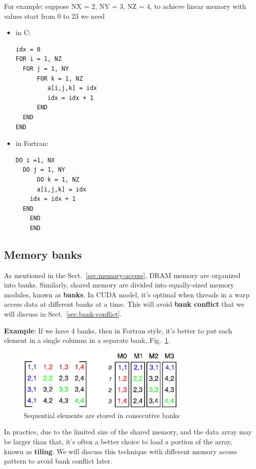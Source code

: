 For example: suppose NX = 2, NY = 3, NZ = 4, to achieve linear memory
with values start from 0 to 23 we need
\begin{multicols}{2}
  \begin{itemize}
  \item in C:
\begin{verbatim}
idx = 0
FOR i = 1, NZ
  FOR j = 1, NY
      FOR k = 1, NZ
         a[i,j,k] = idx
         idx = idx + 1
      END
  END
END
\end{verbatim}
    \columnbreak
  \item in Fortran:
\begin{verbatim}
DO i =1, NX
  DO j = 1, NY
      DO k = 1, NZ
      a[i,j,k] = idx
    idx = idx + 1
  END
    END
    END
\end{verbatim}
  \end{itemize}  
\end{multicols}

\subsection{Memory banks}
\label{sec:memory-banks}

As mentioned in the Sect.~\ref{sec:memory-access}, DRAM memory are
organized into banks. Similarly, shared memory are divided into
equally-sized memory modules, known as {\bf banks}. In CUDA model,
it's optimal when threads in a warp access data at different banks at
a time. This will avoid {\bf bank conflict} that we will discuss in
Sect.~\ref{sec:bank-conflict}.

{\bf Example}: If we have 4 banks, then in Fortran style, it's better
to put each element in a single columns in a separate bank,
Fig.~\ref{fig:bank_sample}. 

\begin{figure}[hbt]
  \centerline{\includegraphics[height=3cm,
    angle=0]{./images/banks_sample.eps}}
  \caption{Sequential elements are stored in consecutive banks}
  \label{fig:bank_sample}
\end{figure}

In practice, due to the limited size of the shared memory, and the
data array may be larger than that, it's often a better choice to load
a portion of the array, known as {\bf tiling}. We will discuss this
technique with different memory access pattern to avoid bank conflict
later.

